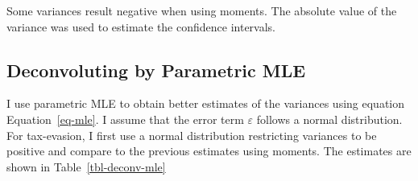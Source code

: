 \documentclass[
  12pt]{article}
\theoremstyle{definition}
\theoremstyle{remark}
\begin{document}
Some variances result negative when using moments. The absolute value of
the variance was used to estimate the confidence intervals.

\subsection{Deconvoluting by Parametric
MLE}\label{deconvoluting-by-parametric-mle}

I use parametric MLE to obtain better estimates of the variances using
equation Equation~\ref{eq-mle}. I assume that the error term
\(\varepsilon\) follows a normal distribution. For tax-evasion, I first
use a normal distribution restricting variances to be positive and
compare to the previous estimates using moments. The estimates are shown
in Table~\ref{tbl-deconv-mle}
\end{document}
